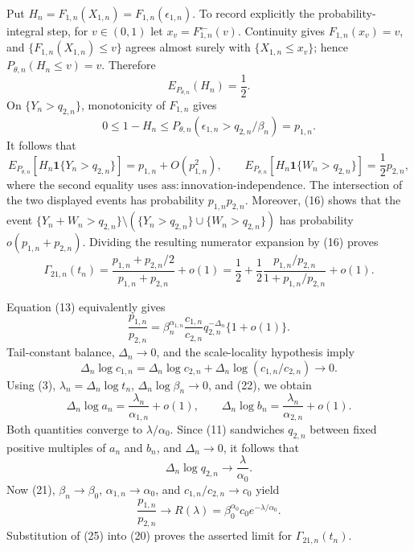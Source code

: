 Put \(H_n=F_{1,n}(X_{1,n})=F_{1,n}(\epsilon_{1,n})\).  To record explicitly the probability-integral step, for \(v\in(0,1)\) let \(x_v=F_{1,n}^{\leftarrow}(v)\).  Continuity gives \(F_{1,n}(x_v)=v\), and \(\{F_{1,n}(X_{1,n})\leq v\}\) agrees almost surely with \(\{X_{1,n}\leq x_v\}\); hence \(P_{\theta,n}(H_n\leq v)=v\).  Therefore
\[
E_{P_{\theta,n}}(H_n)=\frac12.
\tag{17}
\]
On \(\{Y_n>q_{2,n}\}\), monotonicity of \(F_{1,n}\) gives
\[
0\leq1-H_n\leq P_{\theta,n}(\epsilon_{1,n}>q_{2,n}/\beta_n)=p_{1,n}.
\tag{18}
\]
It follows that
\[
E_{P_{\theta,n}}[H_n\mathbf 1\{Y_n>q_{2,n}\}]
=p_{1,n}+O(p_{1,n}^2),
\qquad
E_{P_{\theta,n}}[H_n\mathbf 1\{W_n>q_{2,n}\}]
=\frac12p_{2,n},
\tag{19}
\]
where the second equality uses \(\mathrm{ass{:}innovation\text{-}independence}\).  The intersection of the two displayed events has probability \(p_{1,n}p_{2,n}\).  Moreover, (16) shows that the event \(\{Y_n+W_n>q_{2,n}\}\setminus(\{Y_n>q_{2,n}\}\cup\{W_n>q_{2,n}\})\) has probability \(o(p_{1,n}+p_{2,n})\).  Dividing the resulting numerator expansion by (16) proves
\[
\Gamma_{21,n}(t_n)
=\frac{p_{1,n}+p_{2,n}/2}{p_{1,n}+p_{2,n}}+o(1)
=\frac12+\frac12\frac{p_{1,n}/p_{2,n}}{1+p_{1,n}/p_{2,n}}+o(1).
\tag{20}
\]

Equation (13) equivalently gives
\[
\frac{p_{1,n}}{p_{2,n}}
=\beta_n^{\alpha_{1,n}}\frac{c_{1,n}}{c_{2,n}}
q_{2,n}^{-\Delta_n}\{1+o(1)\}.
\tag{21}
\]
Tail-constant balance, \(\Delta_n\to0\), and the scale-locality hypothesis imply
\[
\Delta_n\log c_{1,n}
=\Delta_n\log c_{2,n}
+\Delta_n\log(c_{1,n}/c_{2,n})\longrightarrow0.
\tag{22}
\]
Using (3), \(\lambda_n=\Delta_n\log t_n\), \(\Delta_n\log\beta_n\to0\), and (22), we obtain
\[
\Delta_n\log a_n=\frac{\lambda_n}{\alpha_{1,n}}+o(1),
\qquad
\Delta_n\log b_n=\frac{\lambda_n}{\alpha_{2,n}}+o(1).
\tag{23}
\]
Both quantities converge to \(\lambda/\alpha_0\).  Since (11) sandwiches \(q_{2,n}\) between fixed positive multiples of \(a_n\) and \(b_n\), and \(\Delta_n\to0\), it follows that
\[
\Delta_n\log q_{2,n}\longrightarrow\frac{\lambda}{\alpha_0}.
\tag{24}
\]
Now (21), \(\beta_n\to\beta_0\), \(\alpha_{1,n}\to\alpha_0\), and \(c_{1,n}/c_{2,n}\to c_0\) yield
\[
\frac{p_{1,n}}{p_{2,n}}
\longrightarrow
R(\lambda)=\beta_0^{\alpha_0}c_0e^{-\lambda/\alpha_0}.
\tag{25}
\]
Substitution of (25) into (20) proves the asserted limit for \(\Gamma_{21,n}(t_n)\).

